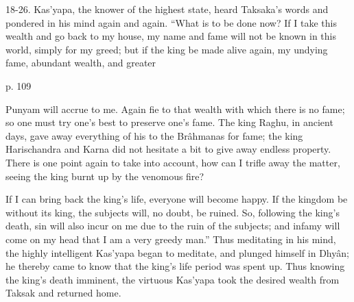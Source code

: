  

18-26. Kas'yapa, the knower of the highest state, heard Taksaka's words and pondered in his mind again and again. “What is to be done now? If I take this wealth and go back to my house, my name and fame will not be known in this world, simply for my greed; but if the king be made alive again, my undying fame, abundant wealth, and greater

 

p. 109

 

Punyam will accrue to me. Again fie to that wealth with which there is no fame; so one must try one's best to preserve one's fame. The king Raghu, in ancient days, gave away everything of his to the Brâhmanas for fame; the king Harischandra and Karna did not hesitate a bit to give away endless property. There is one point again to take into account, how can I trifle away the matter, seeing the king burnt up by the venomous fire?

 

If I can bring back the king's life, everyone will become happy. If the kingdom be without its king, the subjects will, no doubt, be ruined. So, following the king's death, sin will also incur on me due to the ruin of the subjects; and infamy will come on my head that I am a very greedy man.” Thus meditating in his mind, the highly intelligent Kas'yapa began to meditate, and plunged himself in Dhyân; he thereby came to know that the king's life period was spent up. Thus knowing the king's death imminent, the virtuous Kas'yapa took the desired wealth from Taksak and returned home.

 

